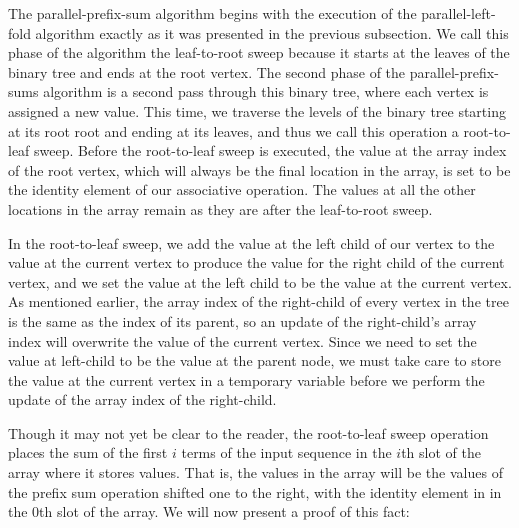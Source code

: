 \documentclass[12pt,twoside]{reedthesis}
\begin{document}
The parallel-prefix-sum algorithm begins with the execution of the parallel-left-fold algorithm exactly as it was presented in the previous subsection. We call this phase of the algorithm the leaf-to-root sweep because it starts at the leaves of the binary tree and ends at the root vertex. The second phase of the parallel-prefix-sums algorithm is a second pass through this binary tree, where each vertex is assigned a new value. This time, we traverse the levels of the binary tree starting at its root root and ending at its  leaves, and thus we call this operation a root-to-leaf sweep. Before the root-to-leaf sweep is executed, the value at the array index of the root vertex, which will always be the final location in the array, is set to be the identity element of our associative operation. The values at all the other locations in the array remain as they are after the leaf-to-root sweep.

In the root-to-leaf sweep, we add the value at the left child of our vertex to the value at the current vertex to produce the value for the right child of the current vertex, and we set the value at the left child to be the value at the current vertex. As mentioned earlier, the array index of the right-child of every vertex in the tree is the same as the index of its parent, so an update of the right-child's array index will overwrite the value of the current vertex. Since we need to set the value at left-child to be the value at the parent node, we must take care to store the value at the current vertex in a temporary variable before we perform the update of the array index of the right-child.

Though it may not yet be clear to the reader, the root-to-leaf sweep operation places the sum of the first $i$ terms of the input sequence in the $i$th slot of the array where it stores values. That is, the values in the array will be the values of the prefix sum operation shifted one to the right, with the identity element in in the $0$th slot of the array. We will now present a proof of this fact:
\end{document}
